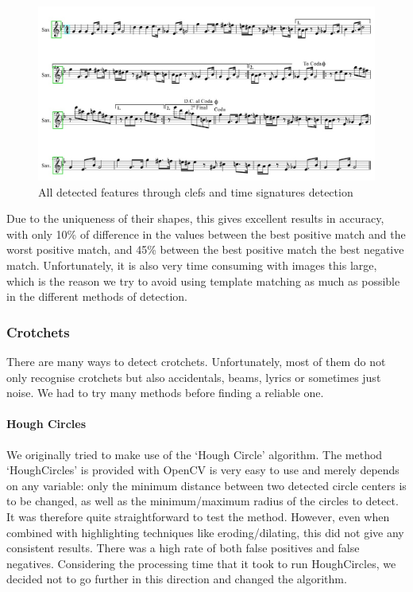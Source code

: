 \begin{figure}[h!]
	\centering
	\includegraphics[width=1\textwidth]{./assets/detectedfeatures.jpg}
	\caption{All detected features through clefs and time signatures detection}
	\label{image:detectedfeatures}
\end{figure}


Due to the uniqueness of their shapes, this gives excellent results in accuracy, with only 10\% of difference in the values between the best positive match and the worst positive match, and 45\% between the best positive match the best negative match. Unfortunately, it is also very time consuming with images this large, which is the reason we try to avoid using template matching as much as possible in the different
methods of detection.

\subsubsection{Crotchets}

There are many ways to detect crotchets. Unfortunately, most of them do not only recognise crotchets but also accidentals, beams, lyrics or sometimes just noise. We had to try many methods before finding a reliable one.

\paragraph{Hough Circles}

We originally tried to make use of the ‘Hough Circle’ algorithm. The method ‘HoughCircles’ is provided with OpenCV is very easy to use and merely depends on any variable: only the minimum distance between two detected circle centers is to be changed, as well as the minimum/maximum radius of the circles to detect. It was therefore quite straightforward to test the method. However, even when combined
with highlighting techniques like eroding/dilating, this did not give any consistent results. There was a high rate of both false positives and false negatives. Considering the processing time that it took to run HoughCircles, we decided not to go further in this direction and changed the algorithm.

